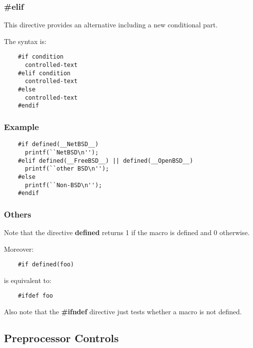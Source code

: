 
\begin{frame}[containsverbatim]
  \frametitle{\textbf{\#elif}}

  This directive provides an alternative including a new conditional part.

  \nl

  The syntax is:

  \begin{verbatim}
    #if condition
      controlled-text
    #elif condition
      controlled-text
    #else
      controlled-text
    #endif
  \end{verbatim}
\end{frame}


\begin{frame}[containsverbatim]
  \frametitle{Example}

  \begin{verbatim}
    #if defined(__NetBSD__)
      printf(``NetBSD\n'');
    #elif defined(__FreeBSD__) || defined(__OpenBSD__)
      printf(``other BSD\n'');
    #else
      printf(``Non-BSD\n'');
    #endif
  \end{verbatim}
\end{frame}


\begin{frame}[containsverbatim]
  \frametitle{Others}

  Note that the directive \textbf{defined} returns 1 if the macro is
  defined and 0 otherwise.

  \nl

  Moreover:

  \begin{verbatim}
    #if defined(foo)
  \end{verbatim}

  is equivalent to:

  \begin{verbatim}
    #ifdef foo
  \end{verbatim}

  Also note that the \textbf{\#ifndef} directive just tests whether a macro
  is not defined.
\end{frame}

%
%

\subsection{Preprocessor Controls}

